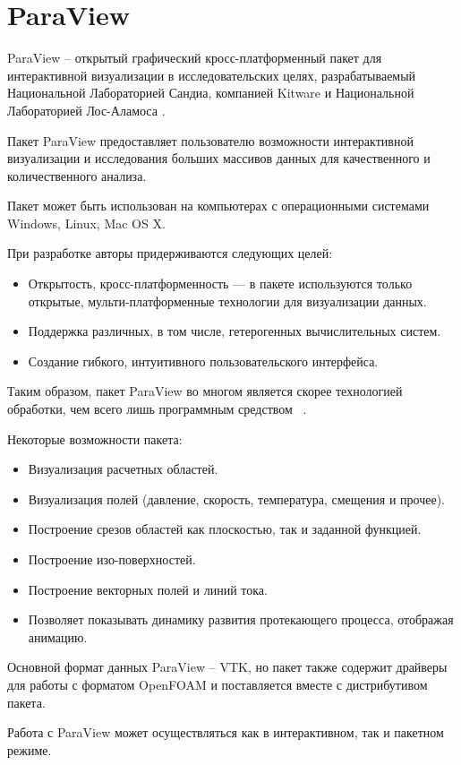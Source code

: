 \documentclass[14pt]{extreport}
\begin{document}
\section{ParaView}
ParaView -- открытый графический кросс-платформенный пакет для интерактивной визуализации в исследовательских целях, разрабатываемый Национальной Лабораторией Сандиа, компанией Kitware и Национальной Лабораторией Лос-Аламоса \cite{ParaviewAbout}.

Пакет ParaView предоставляет пользователю возможности интерактивной визуализации и исследования больших массивов данных для качественного и количественного анализа.

Пакет может быть использован на компьютерах с операционными системами Windows, Linux, Mac OS X.

При разработке авторы придерживаются следующих целей:
\begin{itemize}
\item Открытость, кросс-платформенность — в пакете используются только открытые, мульти-платформенные технологии для визуализации данных.
\item Поддержка различных, в том числе, гетерогенных вычислительных систем.
\item Создание гибкого, интуитивного пользовательского интерфейса.
\end{itemize}

Таким образом, пакет ParaView во многом является скорее технологией обработки, чем всего лишь программным средством ~\cite{ParaviewWiki}.

Некоторые возможности пакета:
\begin{itemize}
\item Визуализация расчетных областей.
\item Визуализация полей (давление, скорость, температура, смещения и прочее).
\item Построение срезов областей как плоскостью, так и заданной функцией.
\item Построение изо-поверхностей.
\item Построение векторных полей и линий тока.
\item Позволяет показывать динамику развития протекающего процесса, отображая анимацию. 
\end{itemize}

Основной формат данных ParaView -- VTK, но пакет также содержит драйверы для работы с форматом OpenFOAM и поставляется вместе с дистрибутивом пакета. 

Работа с ParaView может осуществляться как в интерактивном, так и пакетном режиме.
\end{document}
